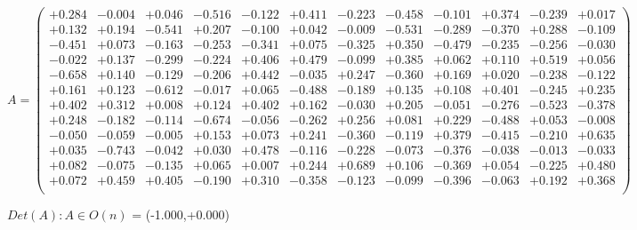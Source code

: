 \documentclass[9pt]{article}
\theoremstyle{plain}
\theoremstyle{definition}
\theoremstyle{remark}
\numberwithin{equation}{section}
\begin{document}
$A = \left(
\begin{array}{
cccccccccccc}
+0.284 & -0.004 & +0.046 & -0.516 & -0.122 & +0.411 & -0.223 & -0.458 & -0.101 & +0.374 & -0.239 & +0.017 \\
+0.132 & +0.194 & -0.541 & +0.207 & -0.100 & +0.042 & -0.009 & -0.531 & -0.289 & -0.370 & +0.288 & -0.109 \\
-0.451 & +0.073 & -0.163 & -0.253 & -0.341 & +0.075 & -0.325 & +0.350 & -0.479 & -0.235 & -0.256 & -0.030 \\
-0.022 & +0.137 & -0.299 & -0.224 & +0.406 & +0.479 & -0.099 & +0.385 & +0.062 & +0.110 & +0.519 & +0.056 \\
-0.658 & +0.140 & -0.129 & -0.206 & +0.442 & -0.035 & +0.247 & -0.360 & +0.169 & +0.020 & -0.238 & -0.122 \\
+0.161 & +0.123 & -0.612 & -0.017 & +0.065 & -0.488 & -0.189 & +0.135 & +0.108 & +0.401 & -0.245 & +0.235 \\
+0.402 & +0.312 & +0.008 & +0.124 & +0.402 & +0.162 & -0.030 & +0.205 & -0.051 & -0.276 & -0.523 & -0.378 \\
+0.248 & -0.182 & -0.114 & -0.674 & -0.056 & -0.262 & +0.256 & +0.081 & +0.229 & -0.488 & +0.053 & -0.008 \\
-0.050 & -0.059 & -0.005 & +0.153 & +0.073 & +0.241 & -0.360 & -0.119 & +0.379 & -0.415 & -0.210 & +0.635 \\
+0.035 & -0.743 & -0.042 & +0.030 & +0.478 & -0.116 & -0.228 & -0.073 & -0.376 & -0.038 & -0.013 & -0.033 \\
+0.082 & -0.075 & -0.135 & +0.065 & +0.007 & +0.244 & +0.689 & +0.106 & -0.369 & +0.054 & -0.225 & +0.480 \\
+0.072 & +0.459 & +0.405 & -0.190 & +0.310 & -0.358 & -0.123 & -0.099 & -0.396 & -0.063 & +0.192 & +0.368 \\
\end{array}
\right)$ \newline 

$Det(A) :   A \in O(n)$ = (-1.000,+0.000)
\end{document}
